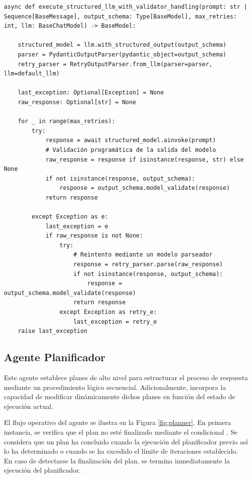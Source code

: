 \begin{lstlisting}[caption={Validación de la salida estructurada de un LLM},label={lst:structured_output}]
  async def execute_structured_llm_with_validator_handling(prompt: str | Sequence[BaseMessage], output_schema: Type[BaseModel], max_retries: int, llm: BaseChatModel) -> BaseModel:

    structured_model = llm.with_structured_output(output_schema)
    parser = PydanticOutputParser(pydantic_object=output_schema)
    retry_parser = RetryOutputParser.from_llm(parser=parser, llm=default_llm)

    last_exception: Optional[Exception] = None
    raw_response: Optional[str] = None

    for _ in range(max_retries):
        try:
            response = await structured_model.ainvoke(prompt)
            # Validación programática de la salida del modelo 
            raw_response = response if isinstance(response, str) else None
            if not isinstance(response, output_schema):
                response = output_schema.model_validate(response)
            return response

        except Exception as e:
            last_exception = e
            if raw_response is not None:
                try:
                    # Reintento mediante un modelo parseador
                    response = retry_parser.parse(raw_response)
                    if not isinstance(response, output_schema):
                        response = output_schema.model_validate(response)
                    return response
                except Exception as retry_e:
                    last_exception = retry_e
    raise last_exception
\end{lstlisting}

\subsection{Agente Planificador}
\label{sec:agente_planificador}
Este agente establece planes de alto nivel para estructurar el proceso de respuesta mediante un procedimiento lógico secuencial. Adicionalmente, incorpora la capacidad de modificar dinámicamente dichos planes en función del estado de ejecución actual.

El flujo operativo del agente se ilustra en la Figura \ref{fig:planner}. En primera instancia, se verifica que el plan no esté finalizado mediante el condicional . Se considera que un plan ha concluido cuando la ejecución del planificador previo así lo ha determinado o cuando se ha excedido el límite de iteraciones establecido. En caso de detectarse la finalización del plan, se termina inmediatamente la ejecución del planificador.

